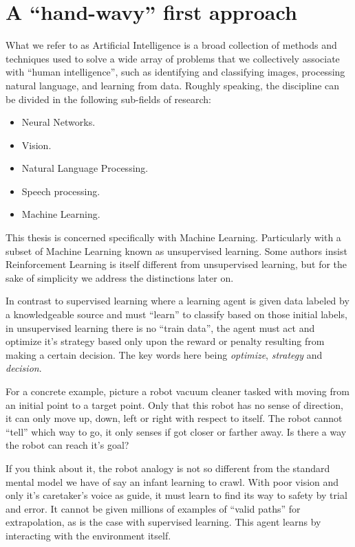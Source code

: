 \section{A ``hand-wavy'' first approach}

What we refer to as Artificial Intelligence is a broad collection of 
methods and techniques used to solve a wide array of problems that we 
collectively associate with ``human intelligence'', such as 
identifying and classifying images, processing natural language, and 
learning from data. Roughly speaking, the discipline can be divided in 
the following sub-fields of research:

\begin{itemize}
	\item Neural Networks.
	\item Vision.
	\item Natural Language Processing.
	\item Speech processing.
	\item Machine Learning.
\end{itemize}

This thesis is concerned specifically with Machine Learning.  
Particularly with a subset of Machine Learning known as unsupervised 
learning.  Some authors \cite{SuttonBarto} insist Reinforcement 
Learning is itself different from unsupervised learning, but for the 
sake of simplicity we address the distinctions later on.

In contrast to supervised learning where a learning agent is given 
data labeled by a knowledgeable source and must ``learn'' to classify 
based on those initial labels, in unsupervised learning there is no 
``train data'', the agent must act and optimize it's strategy based 
only upon the reward or penalty resulting from making a certain 
decision. The key words here being \textit{optimize}, 
\textit{strategy} and \textit{decision}.

For a concrete example, picture a robot vacuum cleaner tasked with 
moving from an initial point to a target point.  Only that this robot 
has no sense of direction, it can only move up, down, left or right 
with respect to itself. The robot cannot ``tell'' which way to go, it 
only senses if got closer or farther away. Is there a way the robot 
can reach it's goal?

If you think about it, the robot analogy is not so different from the 
standard mental model we have of say an infant learning to crawl. With 
poor vision and only it's caretaker's voice as guide, it must learn to 
find its way to safety by trial and error. It cannot be given millions 
of examples of ``valid paths'' for extrapolation, as is the case with 
supervised learning. This agent learns by interacting with the 
environment itself.

